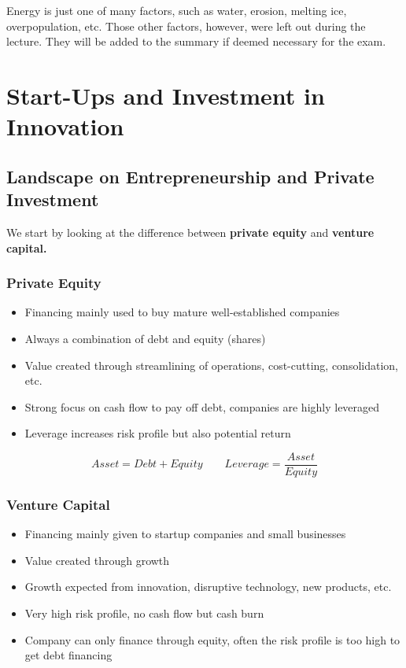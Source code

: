 \documentclass[a4paper]{extarticle}
\begin{document}
Energy is just one of many factors, such as water, erosion, melting ice, overpopulation, etc. Those other factors, however, were left out during the lecture. They will be added to the summary if deemed necessary for the exam.

\section{Start-Ups and Investment in Innovation}

\subsection{Landscape on Entrepreneurship and Private Investment}

We start by looking at the difference between \textbf{private equity} and \textbf{venture capital.}

\subsubsection{Private Equity}

\begin{itemize}
    \item Financing mainly used to buy mature well-established companies
    \item Always a combination of debt and equity (shares)
    \item Value created through streamlining of operations, cost-cutting, consolidation, etc.
    \item Strong focus on cash flow to pay off debt, companies are highly leveraged
    \item Leverage increases risk profile but also potential return
\end{itemize}

\[
    Asset = Debt + Equity \qquad Leverage = \frac{Asset}{Equity}
\]

\subsubsection{Venture Capital}

\begin{itemize}
    \item Financing mainly given to startup companies and small businesses
    \item Value created through growth
    \item Growth expected from innovation, disruptive technology, new products, etc.
    \item Very high risk profile, no cash flow but cash burn
    \item Company can only finance through equity, often the risk profile is too high to get debt financing
\end{itemize}
\end{document}
